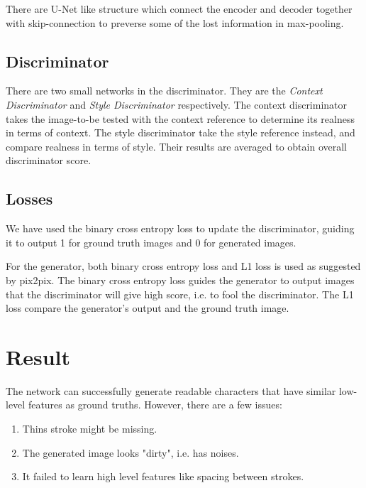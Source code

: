 \documentclass[10pt,twocolumn,letterpaper]{article}
\begin{document}
There are U-Net\cite{DBLP:journals/corr/RonnebergerFB15} like structure which connect the encoder and decoder together with skip-connection to preverse some of the lost information in max-pooling.

\subsection{Discriminator}
There are two small networks in the discriminator. They are the  \textit{Context Discriminator} and \textit{Style Discriminator} respectively. The context discriminator takes the image-to-be tested with the context reference to determine its realness in terms of context. The style discriminator take the style reference instead, and compare realness in terms of style. Their results are averaged to obtain overall discriminator score.

\subsection{Losses}
We have used the binary cross entropy loss to update the discriminator, guiding it to output 1 for ground truth images and 0 for generated images. 

For the generator, both binary cross entropy loss and L1 loss is used as suggested by pix2pix. The binary cross entropy loss guides the generator to output images that the discriminator will give high score, i.e. to fool the discriminator. The L1 loss compare the generator's output and the ground truth image.

\section{Result}
The network can successfully generate readable characters that have similar low-level features as ground truths. However, there are a few issues:

\begin{enumerate}
	\item Thins stroke might be missing.
	\item The generated image looks "dirty", i.e. has noises.
	\item It failed to learn high level features like spacing between strokes.
\end{enumerate}
\end{document}
